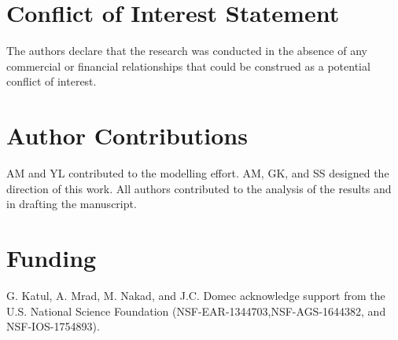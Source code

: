 \documentclass[utf8]{frontiersSCNS} %
\begin{document}




\section*{Conflict of Interest Statement}

The authors declare that the research was conducted in the absence of any commercial or financial relationships that could be construed as a potential conflict of interest.

\section*{Author Contributions}

AM and YL contributed to the modelling effort. AM, GK, and SS designed the direction of this work. All authors contributed to the analysis of the results and in drafting the manuscript.

\section*{Funding}
G. Katul, A. Mrad, M. Nakad, and J.C. Domec acknowledge support from the U.S. National Science Foundation (NSF-EAR-1344703,NSF-AGS-1644382, and NSF-IOS-1754893).
\end{document}
